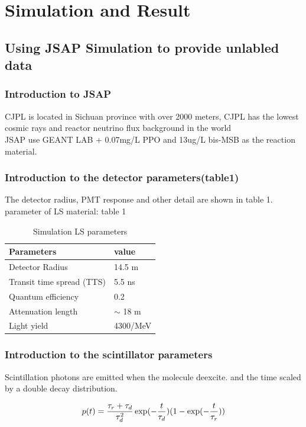 \documentclass{article}
\begin{document}
\section{Simulation and Result}

\subsection{Using JSAP Simulation to provide unlabled data}
\subsubsection{Introduction to JSAP } 
	CJPL is located in Sichuan province with over 2000 meters, CJPL has the lowest cosmic rays and reactor neutrino flux background in the world\\
	JSAP use GEANT LAB + 0.07mg/L PPO and 13ug/L bis-MSB as the reaction material.\\
\subsubsection{Introduction to the detector parameters(table1)}
	The detector radius, PMT response and other detail are shown in table 1.
	parameter of LS material: table 1\\
	
	\begin{table}[h]
	\centering
	\caption{Simulation LS parameters}
	\label{tab:1}
	\begin{tabular}{|l*{1}{l|}}
	\hline
	Parameters & value\\
	\hline
	Detector Radius & 14.5  m\\
	Transit time spread (TTS) & 5.5 ns  \\
	Quantum efficiency & 0.2 \\
	Attenuation length & $\sim$ 18 m\\
	Light yield & 4300/MeV \\
	\hline
	\end{tabular}
	\end{table}
	
\subsubsection{Introduction to the scintillator parameters}
\par Scintillation photons are emitted when the molecule deexcite. and the time scaled by a double decay distribution. 

	\begin{equation}
	\numberwithin{equation}{section}
		p(t) = \frac{\tau_r+\tau_d}{\tau_d^2}\exp(-\frac{t}{\tau_d})(1-\exp(-\frac{t}{\tau_r}))
	\end{equation}
	
\end{document}
